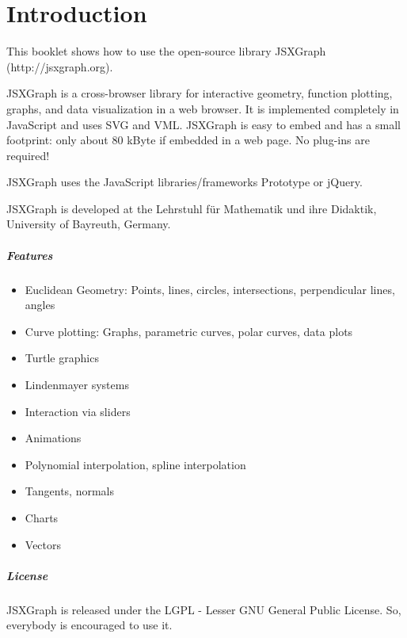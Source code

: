\chapter*{Introduction}
This booklet shows how to use the open-source library JSXGraph (http://jsxgraph.org).


JSXGraph is a cross-browser library for interactive geometry, function plotting, graphs, and data visualization in a web browser. It is implemented completely in JavaScript and uses SVG and VML.
JSXGraph is easy to embed and has a small footprint: only about 80 kByte if embedded in a web page. No plug-ins are required! 

JSXGraph uses the JavaScript libraries/frameworks Prototype or jQuery.

JSXGraph is developed at the Lehrstuhl f\"ur Mathematik und ihre Didaktik, University of Bayreuth, Germany.


\paragraph{Features}
\begin{itemize}
    \item Euclidean Geometry: Points, lines, circles, intersections, perpendicular lines, angles
    \item  Curve plotting: Graphs, parametric curves, polar curves, data plots
    \item  Turtle graphics
    \item  Lindenmayer systems
    \item  Interaction via sliders
    \item  Animations
    \item  Polynomial interpolation, spline interpolation
    \item  Tangents, normals
    \item  Charts
    \item  Vectors
\end{itemize}

\paragraph{License}

JSXGraph is released under the LGPL - Lesser GNU General Public License. So, everybody is encouraged to use it.
